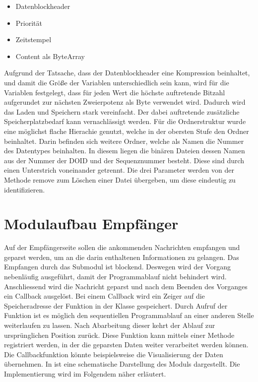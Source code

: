 \begin{itemize}
\item Datenblockheader 
\item Priorität
\item Zeitstempel
\item Content als ByteArray
\end{itemize}

Aufgrund der Tatsache, dass der Datenblockheader eine Kompression beinhaltet,
und damit die Größe der Variablen unterschiedlich sein kann, wird für die
Variablen festgelegt, dass für jeden Wert die höchste auftretende Bitzahl
aufgerundet zur nächsten Zweierpotenz als Byte verwendet wird. Dadurch
wird das Laden und Speichern stark vereinfacht. Der dabei auftretende zusätzliche
Speicherplatzbedarf kann vernachlässigt werden.
\newline 
Für die Ordnerstruktur wurde eine möglichst flache Hierachie genutzt, welche in
der obersten Stufe den Ordner  beinhaltet. Darin befinden sich
weitere Ordner, welche als Namen die Nummer des Datentypes beinhalten. In diesem liegen die binären
Dateien dessen Namen aus der Nummer der DOID und der Sequenznummer besteht.
Diese sind durch einen Unterstrich voneinander getrennt. Die drei Parameter
werden von der Methode remove zum Löschen einer Datei übergeben, um diese
eindeutig zu identifizieren.

\section{Modulaufbau Empfänger}

Auf der Empfängerseite sollen die ankommenden Nachrichten empfangen und geparst
werden, um an die darin enthaltenen Informationen zu gelangen. Das Empfangen
durch das Submodul  ist blockend. Deswegen wird der Vorgang
nebenläufig ausgeführt, damit der Programmablauf nicht behindert wird. Anschliessend wird
die Nachricht geparst und nach dem Beenden des Vorganges ein Callback
 ausgelöst. Bei einem Callback wird
ein Zeiger auf die Speicheradresse der Funktion in der Klasse gespeichert. Durch
Aufruf der Funktion ist es möglich den sequentiellen Programmablauf an einer
anderen Stelle weiterlaufen zu lassen. Nach Abarbeitung dieser kehrt der Ablauf
zur ursprünglichen Position zurück. Diese Funktion kann mittels einer Methode
registriert werden, in der die geparsten Daten weiter verarbeitet werden können.
Die Callbackfunktion könnte beispielsweise die Visualisierung der Daten
übernehmen. \newline 
In  ist eine schematische Darstellung des
Moduls dargestellt. Die Implementierung wird im Folgendem näher erläutert.

